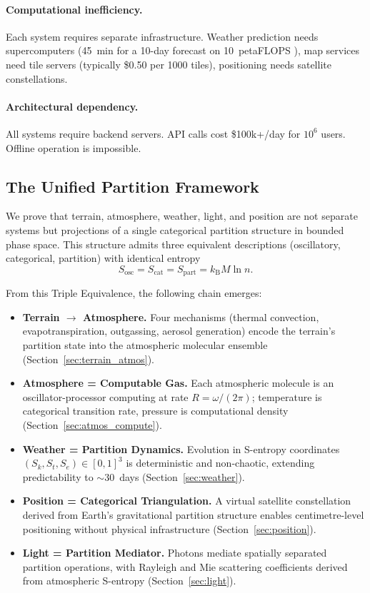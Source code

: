 \documentclass[10pt,twocolumn]{article}
\theoremstyle{definition}
\theoremstyle{remark}
\newcommand{\kB}{k_{\mathrm{B}}}
\newcommand{\Sk}{S_k}
\newcommand{\St}{S_t}
\newcommand{\Se}{S_e}
\begin{document}
\paragraph{Computational inefficiency.}
Each system requires separate infrastructure.  Weather
prediction needs supercomputers (45~min for a 10-day forecast
on 10~petaFLOPS \citep{Bauer2015}), map services need tile
servers (typically \$0.50 per 1000 tiles), positioning needs
satellite constellations.

\paragraph{Architectural dependency.}
All systems require backend servers.  API calls cost
\$100k+/day for $10^6$ users.  Offline operation is
impossible.

\subsection{The Unified Partition Framework}\label{sec:unified}

We prove that terrain, atmosphere, weather, light, and position
are not separate systems but projections of a single
categorical partition structure in bounded phase space.  This
structure admits three equivalent descriptions (oscillatory,
categorical, partition) with identical entropy
\begin{equation}\label{eq:triple_intro}
  S_{\mathrm{osc}} = S_{\mathrm{cat}} = S_{\mathrm{part}}
  = \kB M\ln n.
\end{equation}

From this Triple Equivalence, the following chain emerges:

\begin{itemize}[leftmargin=*,itemsep=2pt]
\item \textbf{Terrain $\to$ Atmosphere.}  Four mechanisms
  (thermal convection, evapotranspiration, outgassing,
  aerosol generation) encode the terrain's partition state
  into the atmospheric molecular ensemble
  (Section~\ref{sec:terrain_atmos}).
\item \textbf{Atmosphere = Computable Gas.}  Each atmospheric
  molecule is an oscillator-processor computing at rate
  $R=\omega/(2\pi)$; temperature is categorical transition
  rate, pressure is computational density
  (Section~\ref{sec:atmos_compute}).
\item \textbf{Weather = Partition Dynamics.}  Evolution in
  S-entropy coordinates $(\Sk,\St,\Se)\in[0,1]^3$ is
  deterministic and non-chaotic, extending predictability to
  ${\sim}30$~days (Section~\ref{sec:weather}).
\item \textbf{Position = Categorical Triangulation.}  A
  virtual satellite constellation derived from Earth's
  gravitational partition structure enables centimetre-level
  positioning without physical infrastructure
  (Section~\ref{sec:position}).
\item \textbf{Light = Partition Mediator.}  Photons mediate
  spatially separated partition operations, with Rayleigh
  and Mie scattering coefficients derived from atmospheric
  S-entropy (Section~\ref{sec:light}).
\end{itemize}
\end{document}
